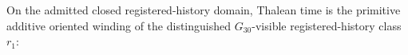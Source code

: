 \setcounter{theorem}{0}
\begin{definition}
On the admitted closed registered-history domain, Thalean time is the primitive additive oriented winding of the distinguished $G_{30}$-visible registered-history class $r_1$:

\end{definition}
